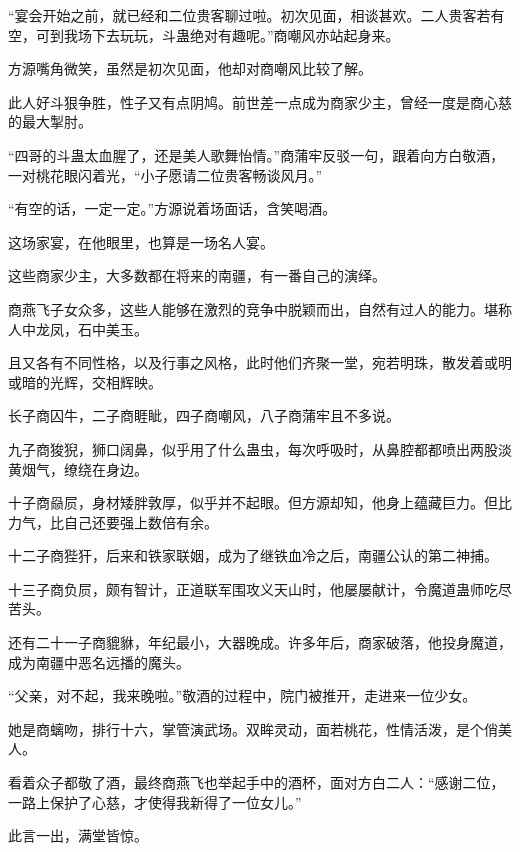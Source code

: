 \begin{this_body}
“宴会开始之前，就已经和二位贵客聊过啦。初次见面，相谈甚欢。二人贵客若有空，可到我场下去玩玩，斗蛊绝对有趣呢。”商嘲风亦站起身来。

方源嘴角微笑，虽然是初次见面，他却对商嘲风比较了解。

此人好斗狠争胜，性子又有点阴鸠。前世差一点成为商家少主，曾经一度是商心慈的最大掣肘。

“四哥的斗蛊太血腥了，还是美人歌舞怡情。”商蒲牢反驳一句，跟着向方白敬酒，一对桃花眼闪着光，“小子愿请二位贵客畅谈风月。”

“有空的话，一定一定。”方源说着场面话，含笑喝酒。

这场家宴，在他眼里，也算是一场名人宴。

这些商家少主，大多数都在将来的南疆，有一番自己的演绎。

商燕飞子女众多，这些人能够在激烈的竞争中脱颖而出，自然有过人的能力。堪称人中龙凤，石中美玉。

且又各有不同性格，以及行事之风格，此时他们齐聚一堂，宛若明珠，散发着或明或暗的光辉，交相辉映。

长子商囚牛，二子商睚眦，四子商嘲风，八子商蒲牢且不多说。

九子商狻猊，狮口阔鼻，似乎用了什么蛊虫，每次呼吸时，从鼻腔都都喷出两股淡黄烟气，缭绕在身边。

十子商赑屃，身材矮胖敦厚，似乎并不起眼。但方源却知，他身上蕴藏巨力。但比力气，比自己还要强上数倍有余。

十二子商狴犴，后来和铁家联姻，成为了继铁血冷之后，南疆公认的第二神捕。

十三子商负屃，颇有智计，正道联军围攻义天山时，他屡屡献计，令魔道蛊师吃尽苦头。

还有二十一子商貔貅，年纪最小，大器晚成。许多年后，商家破落，他投身魔道，成为南疆中恶名远播的魔头。

“父亲，对不起，我来晚啦。”敬酒的过程中，院门被推开，走进来一位少女。

她是商螭吻，排行十六，掌管演武场。双眸灵动，面若桃花，性情活泼，是个俏美人。

看着众子都敬了酒，最终商燕飞也举起手中的酒杯，面对方白二人：“感谢二位，一路上保护了心慈，才使得我新得了一位女儿。”

此言一出，满堂皆惊。

\end{this_body}

